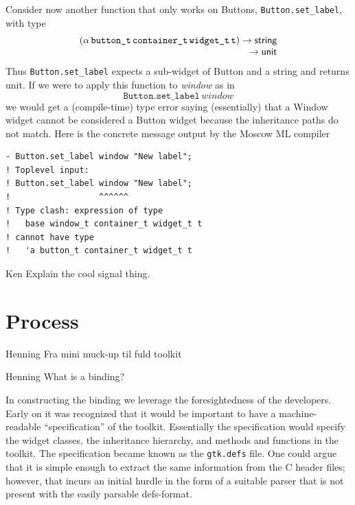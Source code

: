 \documentclass[workingdraft,endnotes]{usetex-v1}
\begin{document}
Consider now another function that only works on Buttons, \texttt{Button.set\_label}, with type
\begin{displaymath}\begin{array}{l}
(\tApp{\tApp{\tApp{\tApp{\alpha}{\tWitness{button}}}{\tWitness{container}}}{\tWitness{widget}}}{\tName{t}})
\rightarrow
\tString
\\
\multicolumn{1}{r}{\rightarrow\tUnit}
\end{array}\end{displaymath}
Thus \texttt{Button.set\_label} expects a sub-widget of Button and a string and returns unit.
If we were to apply this function to \textit{window} as in
\begin{displaymath}
\texttt{Button.set\_label}\,\textit{window}
\end{displaymath}
we would get a (compile-time) type error saying (essentially) that
a Window widget cannot be considered a Button widget because the
inheritance paths do not match. Here is the concrete message output
by the Moscow ML compiler
\begin{verbatim}
- Button.set_label window "New label";
! Toplevel input:
! Button.set_label window "New label";
!                  ^^^^^^
! Type clash: expression of type
!   base window_t container_t widget_t t
! cannot have type
!   'a button_t container_t widget_t t
\end{verbatim}

\begin{ednote}{Ken}
  Explain the cool signal thing.
\end{ednote}

\section{Process}
\label{sec:process}

\begin{ednote}{Henning}
  Fra mini muck-up til fuld toolkit
\end{ednote}

\begin{ednote}{Henning}
  What is a binding?
\end{ednote}

In constructing the \mgtk binding we leverage the foresightedness of
the \gtk developers. Early on it was recognized that it would be
important to have a machine-readable ``specification'' of the toolkit.
Essentially the specification would specify the widget classes, the
inheritance hierarchy, and methods and functions in the toolkit. The
specification became known as the \texttt{gtk.defs} file. One could
argue that it is simple enough to extract the same information from
the C header files; however, that incurs an initial hurdle in the
form of a suitable parser that is not present with the easily parsable
defs-format.
\end{document}
